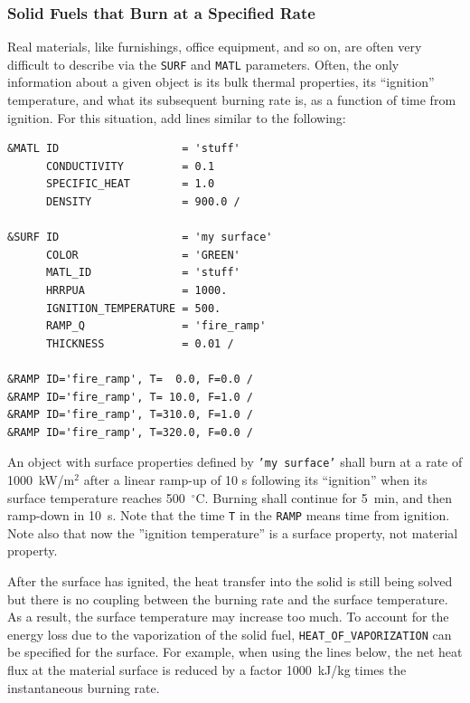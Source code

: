 \documentclass[11pt]{book}
\newcommand{\ct}{\tt\small}
\begin{document}
\subsubsection{Solid Fuels that Burn at a Specified Rate}
Real materials, like furnishings, office equipment, and so on, are
often very difficult to describe via the {\ct SURF} and {\ct MATL}
parameters. Often, the only information about a given object is its
bulk thermal properties, its ``ignition'' temperature, and what its
subsequent burning rate is, as a function of time from ignition. For
this situation, add lines similar to the following:

\footnotesize
\begin{verbatim}
&MATL ID                   = 'stuff'
      CONDUCTIVITY         = 0.1
      SPECIFIC_HEAT        = 1.0
      DENSITY              = 900.0 /

&SURF ID                   = 'my surface'
      COLOR                = 'GREEN'
      MATL_ID              = 'stuff'
      HRRPUA               = 1000.
      IGNITION_TEMPERATURE = 500.
      RAMP_Q               = 'fire_ramp'
      THICKNESS            = 0.01 /

&RAMP ID='fire_ramp', T=  0.0, F=0.0 /
&RAMP ID='fire_ramp', T= 10.0, F=1.0 /
&RAMP ID='fire_ramp', T=310.0, F=1.0 /
&RAMP ID='fire_ramp', T=320.0, F=0.0 /
\end{verbatim} \normalsize

\noindent
An object with surface properties defined by {\ct 'my surface'} shall
burn at a rate of 1000~kW/m$^2$ after a linear ramp-up of 10 s
following its ``ignition'' when its surface temperature reaches
500~$^\circ$C. Burning shall continue for 5~min, and then ramp-down
in 10~s. Note that the time {\ct T} in the {\ct RAMP} means time from
ignition. Note also that now the ''ignition temperature'' is a surface
property, not material property.

After the surface has ignited, the heat transfer into the solid is
still being solved but there is no coupling between the burning rate
and the surface temperature. As a result, the surface temperature may
increase too much. To account for the energy loss due to the
vaporization of the solid fuel, {\ct HEAT\_OF\_VAPORIZATION} can be
specified for the surface. For example, when using the lines below,
the net heat flux at the material surface is reduced by a factor
1000~kJ/kg times the instantaneous burning rate.
\end{document}

